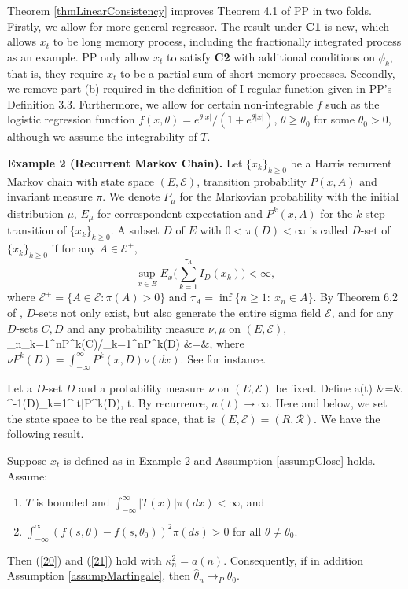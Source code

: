 Theorem \ref{thmLinearConsistency} improves Theorem 4.1 of PP in two folds. Firstly, we allow for more general regressor. The result under {\bf C1} is new, which allows $x_t$ to be long memory process, including the fractionally integrated process as an example. PP only allow $x_t$ to satisfy {\bf C2} with additional conditions on $\phi_k$, that is, they require $x_t$ to be a partial sum of short memory processes. Secondly, we remove part (b) required in the definition of I-regular function given in PP's Definition 3.3. Furthermore,  we allow for certain  non-integrable $f$  such as the logistic regression function $f(x, \theta)=e^{\theta |x|}/(1+e^{\theta |x|})$, $ \theta\ge \theta_0$ for some $\theta_0>0$, although we assume the integrability of  $T$.

\medskip \noindent
{\bf Example 2  (Recurrent Markov Chain).}
Let $\{x_k\}_{k\ge 0}$ be a Harris recurrent Markov chain with state space $(E, \mathcal{E})$,
transition probability $P(x, A)$ and invariant measure $\pi$. We denote $P_\mu$ for the Markovian probability
with the initial distribution $\mu$, $E_\mu$ for correspondent expectation and $P^k(x, A)$
for the $k$-step transition of $\{x_k\}_{k\ge 0}$.  A subset $D$ of $E$ with $0<\pi(D)<\infty$ is called $D$-set of $\{x_k\}_{k\ge 0}$ if for any $A\in \mathcal{E}^+$,
$$
\sup_{x\in E} E_x\big(\sum_{k=1}^{\tau_A}I_D(x_k)\big)<\infty,
$$
where $ \mathcal{E}^+=\{A\in  \mathcal{E}: \pi(A)>0\}$ and $\tau_A=\inf\{n\ge 1: \ x_n\in A\}$. By Theorem 6.2 of \cite{orey1971},
$D$-sets not only exist,  but also generate the entire sigma field $\mathcal{E}$, and
 for any $D$-sets $C, D$ and any probability measure $\nu, \mu$ on $(E, \mathcal{E})$,
\be
\lim_{n\to\infty}\sum_{k=1}^n\nu P^k(C)/\sum_{k=1}^n\mu P^k(D) &=&, 
\ee
where $\nu P^k(D) =\int_{-\infty}^{\infty} P^k(x, D)\nu(dx)$. See \cite{nummelin2004} for instance.

Let a $D$-set $D$ and a probability measure $\nu$ on $(E, \mathcal{E})$ be fixed. Define
\bestar
a(t) &=& \pi^{-1}(D)\sum_{k=1}^{[t]}\nu P^k(D), \quad t.
\eestar
 By recurrence, $a(t)\to\infty$. Here and below, we set the state space to be the real space, that is $(E, \mathcal{E}) = (R, \mathcal{R})$. We have the following result.

\begin{thm}  Suppose $x_t$ is defined as in Example 2 and Assumption \ref{assumpClose} holds. Assume:
\begin{enumerate}[label=(\roman{*}), leftmargin=*] \itemsep0pt \parskip0pt 
\item $T$ is bounded and $\int_{-\infty}^{\infty} |T(x)|\pi(dx) < \infty$, and
\item $\int_{-\infty}^{\infty} (f(s, \theta) - f(s, \theta_0))^2 \pi(ds)>0$ for all $\theta\not=\theta_0$.
\end{enumerate}
Then (\ref {20}) and (\ref {21}) hold with $\kappa^2_n=a(n)$.  Consequently,
if in addition  Assumption \ref{assumpMartingale}, then $\hat{\theta}_n \rightarrow_P \theta_0$.

\end{thm}

